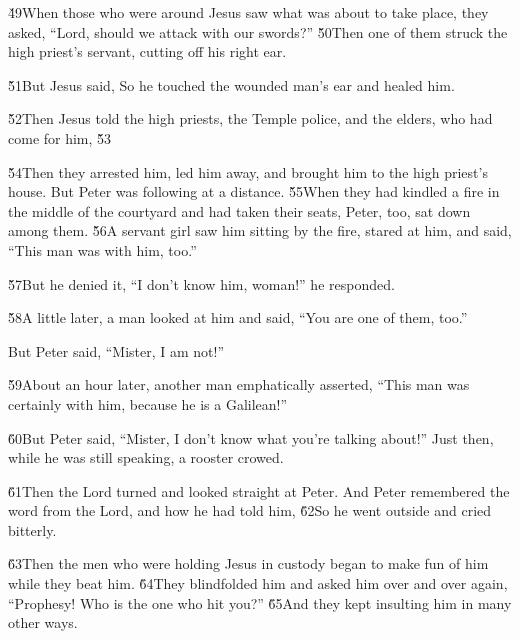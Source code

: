 \v{49}When those who were around Jesus saw what was about to take place, they asked, ``Lord, should we attack with our swords?'' \v{50}Then one of them struck the high priest's servant, cutting off his right ear.

\v{51}But Jesus said,  So he touched the wounded man's ear and healed him.

\v{52}Then Jesus told the high priests, the Temple police, and the elders, who had come for him,  \v{53}

\v{54}Then they arrested him, led him away, and brought him to the high priest's house. But Peter was following at a distance. \v{55}When they had kindled a fire in the middle of the courtyard and had taken their seats, Peter, too, sat down among them. \v{56}A servant girl saw him sitting by the fire, stared at him, and said, ``This man was with him, too.''

\v{57}But he denied it, ``I don't know him, woman!'' he responded.

\v{58}A little later, a man looked at him and said, ``You are one of them, too.''

But Peter said, ``Mister, I am not!''

\v{59}About an hour later, another man emphatically asserted, ``This man was certainly with him, because he is a Galilean!''

\v{60}But Peter said, ``Mister, I don't know what you're talking about!'' Just then, while he was still speaking, a rooster crowed.

\v{61}Then the Lord turned and looked straight at Peter. And Peter remembered the word from the Lord, and how he had told him,  \v{62}So he went outside and cried bitterly.

\v{63}Then the men who were holding Jesus in custody began to make fun of him while they beat him. \v{64}They blindfolded him and asked him over and over again, ``Prophesy! Who is the one who hit you?'' \v{65}And they kept insulting him in many other ways.

